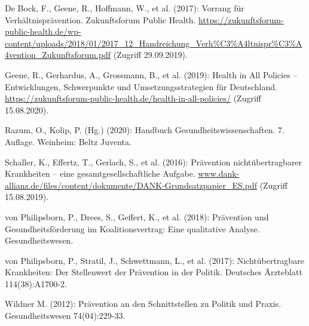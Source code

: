 \documentclass{article}
\begin{document}
De Bock, F., Geene, R., Hoffmann, W., et al. (2017): Vorrang für Verhältnisprävention. Zukunftsforum Public Health. \href{https://zukunftsforum-public-health.de/wp-content/uploads/2018/01/2017_12_Handreichung_Verh%C3%A4ltnispr%C3%A4vention_Zukunftsforum.pdf}{https://zukunftsforum-public-health.de/wp-content/uploads/2018/01/2017\_12\_Handreichung\_Verh\%C3\%A4ltnispr\%C3\%A4vention\_Zukunftsforum.pdf} (Zugriff 29.09.2019).


Geene, R., Gerhardus, A., Grossmann, B., et al. (2019): Health in All Policies – Entwicklungen, Schwerpunkte und Umsetzungsstrategien für Deutschland. \href{https://zukunftsforum-public-health.de/health-in-all-policies/}{https://zukunftsforum-public-health.de/health-in-all-policies/} (Zugriff 15.08.2020).


Razum, O., Kolip, P. (Hg.) (2020): Handbuch Gesundheitswissenschaften. 7. Auflage. Weinheim: Beltz Juventa.


Schaller, K., Effertz, T., Gerlach, S., et al. (2016): Prävention nichtübertragbarer Krankheiten – eine gesamtgesellschaftliche Aufgabe. \href{http://www.dank-allianz.de/files/content/dokumente/DANK-Grundsatzpapier_ES.pdf}{www.dank-allianz.de/files/content/dokumente/DANK-Grundsatzpapier\_ES.pdf} (Zugriff 15.08.2019).


von Philipsborn, P., Drees, S., Geffert, K., et al. (2018): Prävention und Gesundheitsförderung im Koalitionsvertrag: Eine qualitative Analyse. Gesundheitswesen.


von Philipsborn, P., Stratil, J., Schwettmann, L., et al. (2017): Nichtübertragbare Krankheiten: Der Stellenwert der Prävention in der Politik. Deutsches Ärzteblatt 114(38):A1700-2.


Wildner M. (2012): Prävention an den Schnittstellen zu Politik und Praxis. Gesundheitswesen 74(04):229-33.
\end{document}
